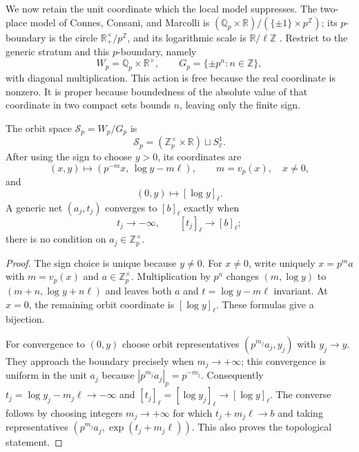 We now retain the unit coordinate which the local model suppresses.  The
two-place model of Connes, Consani, and Marcolli is
$(\mathbb Q_p\times\mathbb R)/(\{\pm1\}\times p^{\mathbb Z})$; its
$p$-boundary is the circle $\mathbb R_+^\times/p^{\mathbb Z}$, and its
logarithmic scale is $\mathbb R/\ell\mathbb Z$
\cite[Section~8.2]{connesConsaniMarcolli2007}.  Restrict to the generic stratum
and this $p$-boundary, namely
\[
 W_p=\mathbb Q_p\times\mathbb R^\times,
 \qquad G_p=\{\pm p^n:n\in\mathbb Z\},
\]
with diagonal multiplication.  This action is free because the real coordinate
is nonzero.  It is proper because boundedness of the absolute value of that
coordinate in two compact sets bounds $n$, leaving only the finite sign.

\begin{proposition}
\label{prop:primitive-semilocal-orbits}
The orbit space $\mathcal S_p=W_p/G_p$ is
\[
 \mathcal S_p=(\mathbb Z_p^\times\times\mathbb R)\sqcup S^1_\ell.
\]
After using the sign to choose $y>0$, its coordinates are
\[
 (x,y)\longmapsto
 \left(p^{-m}x,\,\log y-m\ell\right),
 \qquad m=v_p(x),\quad x\ne0,
\]
and
\[
 (0,y)\longmapsto[\log y]_\ell.
\]
A generic net $(a_j,t_j)$ converges to $[b]_\ell$ exactly when
\[
 t_j\to-\infty,\qquad [t_j]_\ell\to[b]_\ell;
\]
there is no condition on $a_j\in\mathbb Z_p^\times$.
\end{proposition}

\begin{proof}
The sign choice is unique because $y\ne0$.  For $x\ne0$, write uniquely
$x=p^m a$ with $m=v_p(x)$ and $a\in\mathbb Z_p^\times$.  Multiplication by
$p^n$ changes $(m,\log y)$ to $(m+n,\log y+n\ell)$ and leaves both $a$ and
$t=\log y-m\ell$ invariant.  At $x=0$, the remaining orbit coordinate is
$[\log y]_\ell$.  These formulas give a bijection.

For convergence to $(0,y)$ choose orbit representatives
$(p^{m_j}a_j,y_j)$ with $y_j\to y$.  They approach the boundary precisely when
$m_j\to+\infty$; this convergence is uniform in the unit $a_j$ because
$|p^{m_j}a_j|_p=p^{-m_j}$.  Consequently
$t_j=\log y_j-m_j\ell\to-\infty$ and
$[t_j]_\ell=[\log y_j]_\ell\to[\log y]_\ell$.  The converse follows by
choosing integers $m_j\to+\infty$ for which
$t_j+m_j\ell\to b$ and taking representatives
$(p^{m_j}a_j,\exp(t_j+m_j\ell))$.  This also proves the topological statement.
\end{proof}

